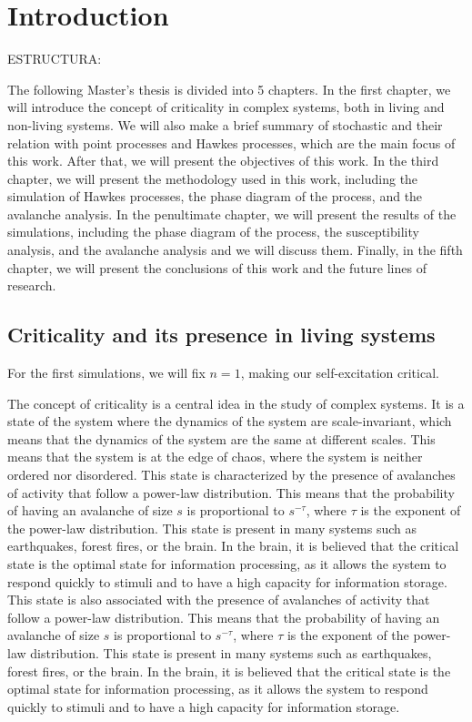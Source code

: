 \chapter{Introduction}\label{ch:intro}

ESTRUCTURA:

The following Master's thesis is divided into 5 chapters. In the first chapter, we will introduce the concept of criticality in complex systems, both in living and non-living systems.  
We will also make a brief summary of stochastic and their relation with point processes and Hawkes processes, which are the main focus of this work. 
After that, we will present the objectives of this work. In the third chapter, we will present the methodology used in this work, including the simulation of Hawkes processes, 
the phase diagram of the process, and the avalanche analysis. In the penultimate chapter, we will present the results of the simulations, including the phase diagram of the process, the 
susceptibility analysis, and the avalanche analysis and we will discuss them. Finally, in the fifth chapter, we will present the conclusions of this work and the future lines of research.


\section{Criticality and its presence in living systems}

For the first simulations, we will fix $n=1$, making our self-excitation critical. 

The concept of criticality is a central idea in the study of complex systems. It is a state of the system where the dynamics of the system are scale-invariant, which means that the
dynamics of the system are the same at different scales. This means that the system is at the edge of chaos, where the system is neither ordered nor disordered. This state is characterized
by the presence of avalanches of activity that follow a power-law distribution. This means that the probability of having an avalanche of size $s$ is proportional to $s^{-\tau}$, where
$\tau$ is the exponent of the power-law distribution. This state is present in many systems such as earthquakes, forest fires, or the brain. In the brain, it is believed that the
critical state is the optimal state for information processing, as it allows the system to respond quickly to stimuli and to have a high capacity for information storage. This state
is also associated with the presence of avalanches of activity that follow a power-law distribution. This means that the probability of having an avalanche of size $s$ is proportional
to $s^{-\tau}$, where $\tau$ is the exponent of the power-law distribution. This state is present in many systems such as earthquakes, forest fires, or the brain. In the brain, it is
believed that the critical state is the optimal state for information processing, as it allows the system to respond quickly to stimuli and to have a high capacity for information storage.



